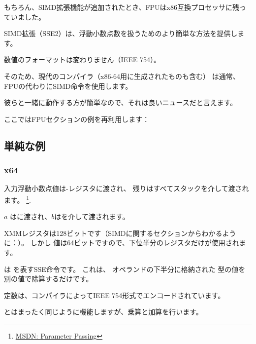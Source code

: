 ﻿%

\label{floating_SIMD}

もちろん、\ac{SIMD}拡張機能が追加されたとき、\ac{FPU}はx86互換プロセッサに残っていました。

\ac{SIMD}拡張（SSE2）は、浮動小数点数を扱うためのより簡単な方法を提供します。

数値のフォーマットは変わりません（IEEE 754）。

そのため、現代のコンパイラ（x86-64用に生成されたものも含む）
は通常、FPUの代わりに\ac{SIMD}命令を使用します。

彼らと一緒に動作する方が簡単なので、それは良いニュースだと言えます。

ここではFPUセクションの例を再利用します：

\subsection{単純な例}



\subsubsection{x64}



入力浮動小数点値は-レジスタに渡され、
残りはすべてスタックを介して渡されます。
\footnote{\href{http://msdn.microsoft.com/en-us/library/zthk2dkh.aspx}{MSDN: Parameter Passing}}.

$a$ はに渡され、$b$はを介して渡されます。

XMMレジスタは128ビットです（SIMDに関するセクションからわかるように：）。
しかし \Tdouble 値は64ビットですので、下位半分のレジスタだけが使用されます。

は
を表すSSE命令です。
これは、
オペランドの下半分に格納された \Tdouble 型の値を別の値で除算するだけです。

定数は、コンパイラによってIEEE 754形式でエンコードされています。

とはまったく同じように機能しますが、乗算と加算を行います。

